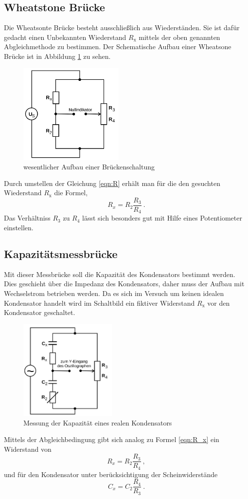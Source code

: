 \subsection{Wheatstone Brücke}
Die Wheatsonte Brücke besteht ausschließlich aus Wiederständen. Sie ist dafür gedacht einen Unbekannten Wiederstand $R_\text{x}$ mittels der oben genannten Abgleichmethode zu bestimmen. Der Schematische Aufbau einer Wheatsone Brücke ist in Abbildung \ref{fig:widerstand} zu sehen.
\begin{figure}
      \centering
      \includegraphics[height=5cm]{picture/2.png}
      \caption{wesentlicher Aufbau einer Brückenschaltung}
      \label{fig:widerstand}
\end{figure}
Durch umstellen der Gleichung \ref{eqn:R} erhält man für die den gesuchten Wiederstand $R_\text{x}$ die Formel,
\begin{equation}
  R_x = R_2 \frac{R_3}{R_4} \ .
  \label{eqn:R_x}
\end{equation}
Das Verhältniss $R_3$ zu $R_4$ lässt sich besonders gut mit Hilfe eines Potentiometer einstellen.
\subsection{Kapazitätsmessbrücke}
Mit dieser Messbrücke soll die Kapazität des Kondensators bestimmt werden. Dies geschieht über die Impedanz des Kondensators, daher muss der Aufbau mit Wechselstrom betrieben werden. Da es sich im Versuch um keinen idealen Kondensator handelt wird im Schaltbild ein fiktiver Widerstand $R_\text{x}$ vor den Kondensator geschaltet.
\begin{figure}
  \centering
  \includegraphics[height=5cm]{picture/3.png}
  \caption{Messung der Kapazität eines realen Kondensators}
  \label{fig:C}
\end{figure}
Mittels der Abgleichbedingung gibt sich analog zu Formel \ref{eqn:R_x} ein Widerstand von
\begin{equation*}
    R_x = R_2 \frac{R_3}{R_4} \ ,
\end{equation*}
und für den Kondensator unter berücksichtigung der Scheinwiderstände
\begin{equation}
  C_x = C_2 \frac{R_4}{R_3} \ .
  \label{eqn:C_x}
\end{equation}

